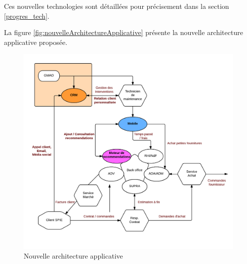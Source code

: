 Ces nouvelles technologies sont détaillées pour précisement dans la section \vref{progres_tech}.

La figure \vref{fig:nouvelleArchitectureApplicative} présente la nouvelle architecture applicative proposée.

\begin{figure}[h!]
	\centering
	\includegraphics[width=1\linewidth]{images/cartographie_applicative_amelioree.png}
	\caption{Nouvelle architecture applicative}
	\label{fig:nouvelleArchitectureApplicative}
\end{figure}

